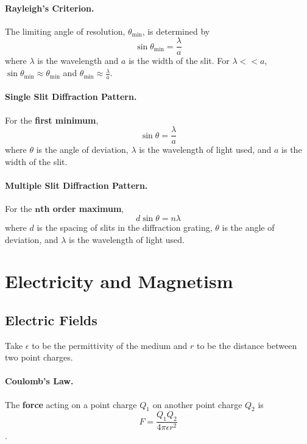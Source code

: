 \documentclass{article}
\begin{document}
\paragraph{Rayleigh's Criterion.} The limiting angle of resolution, $\theta_{\text{min}}$, is determined by \begin{equation}
\sin\theta_{\text{min}} = \frac{\lambda}{a}
\end{equation} where $\lambda$ is the wavelength and $a$ is the width of the slit. For $\lambda << a$, $\sin\theta_{\text{min}} \approx \theta_{\text{min}}$ and $\theta_{\text{min}} \approx \frac{\lambda}{a}$.

\paragraph{Single Slit Diffraction Pattern.} For the \textbf{first minimum}, \begin{equation}
\sin\theta = \frac{\lambda}{a}
\end{equation} where $\theta$ is the angle of deviation, $\lambda$ is the wavelength of light used, and $a$ is the width of the slit.

\paragraph{Multiple Slit Diffraction Pattern.} For the \textbf{$\mathbf{n}$th order maximum}, \begin{equation}
d\sin\theta = n\lambda
\end{equation} where $d$ is the spacing of slits in the diffraction grating, $\theta$ is the angle of deviation, and $\lambda$ is the wavelength of light used.

\section{Electricity and Magnetism}

\subsection{Electric Fields}

Take $\epsilon$ to be the permittivity of the medium and $r$ to be the distance between two point charges.

\paragraph{Coulomb's Law.} The \textbf{force} acting on a point charge $Q_1$ on another point charge $Q_2$ is \begin{equation}
F = \frac{Q_1Q_2}{4\pi\epsilon r^2}
\end{equation}.
\end{document}
